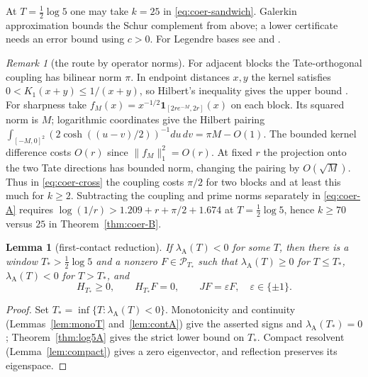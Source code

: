 \documentclass[10pt]{amsart}
\newtheorem{lemma}[theorem]{Lemma}
\theoremstyle{definition}
\theoremstyle{remark}
\newtheorem{remark}[theorem]{Remark}
\newcommand{\lamA}{\lambda_{\mathrm A}(T)}
\begin{document}
At $T=\tfrac12\log5$ one may take $k=25$ in \eqref{eq:coer-sandwich}.
Galerkin approximation bounds the Schur complement from above; a lower
certificate needs an error bound using $c>0$. For Legendre bases see
\cite[Thms.~1.1, 1.4]{Zhu2026} and \cite{Groskin2026}.

\begin{remark}[the route by operator norms]\label{rem:coer-nogo}
For adjacent blocks the Tate-orthogonal coupling has bilinear norm
$\pi$. In endpoint distances $x,y$ the kernel satisfies
$0<K_1(x+y)\le1/(x+y)$, so Hilbert's inequality gives the upper
bound \cite[Thm.~316]{HLP}. For sharpness take
$f_M(x)=x^{-1/2}\mathbf1_{[2re^{-M},2r]}(x)$ on each block.
Its squared norm is $M$; logarithmic coordinates give the Hilbert
pairing $\int_{[-M,0]^2}(2\cosh((u-v)/2))^{-1}du\,dv=\pi M-O(1)$.
The bounded kernel difference costs $O(r)$ since $\|f_M\|_1^2=O(r)$.
At fixed $r$ the projection onto the two Tate directions has bounded
norm, changing the pairing by $O(\sqrt M)$. Thus in
\eqref{eq:coer-cross} the coupling costs $\pi/2$ for two blocks
and at least this much for $k\ge2$. Subtracting the coupling and
prime norms separately in \eqref{eq:coer-A} requires
$\log(1/r)>1.209+r+\pi/2+1.674$ at $T=\tfrac12\log5$, hence
$k\ge70$ versus $25$ in Theorem~\ref{thm:coer-B}.
\end{remark}


\begin{lemma}[first-contact reduction]\label{lem:firstcontact}
If $\lamA<0$ for some $T$, then there is a window $T_*>\frac12\log5$ and a nonzero $F\in\mathcal P_{T_*}$ such
that $\lambda_{\mathrm A}(T)\ge0$ for $T\le T_*$, $\lambda_{\mathrm A}(T)<0$ for $T>T_*$, and
\[
 H_{T_*}\ge0,\qquad H_{T_*}F=0,\qquad JF=\varepsilon F,\quad \varepsilon\in\{\pm1\}.
\]
\end{lemma}
\begin{proof}
Set $T_*=\inf\{T:\lamA<0\}$. Monotonicity and continuity
(Lemmas~\ref{lem:monoT} and~\ref{lem:contA}) give the asserted signs
and $\lambda_{\mathrm A}(T_*)=0$; Theorem~\ref{thm:log5A} gives the
strict lower bound on $T_*$. Compact resolvent (Lemma~\ref{lem:compact})
gives a zero eigenvector, and reflection preserves its eigenspace.
\end{proof}
\end{document}
